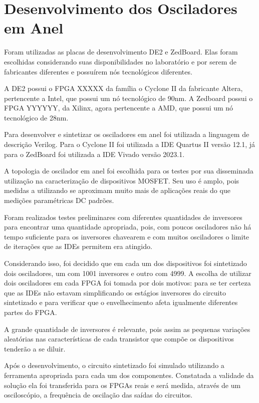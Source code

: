 \section{Desenvolvimento dos Osciladores em Anel}

Foram utilizadas as placas de desenvolvimento DE2 e ZedBoard. Elas foram escolhidas considerando suas disponibilidades no laboratório e por serem de fabricantes diferentes e possuírem nós tecnológicos diferentes.

A DE2 possui o FPGA XXXXX da família o Cyclone II da fabricante Altera, pertencente a Intel, que possui um nó tecnológico de 90nm. A Zedboard possui o FPGA YYYYYY, da Xilinx, agora pertencente a AMD, que possui um nó tecnológico de 28nm.

Para desenvolver e sintetizar os osciladores em anel foi utilizada a linguagem de descrição Verilog. Para o Cyclone II foi utilizada a IDE Quartus II versão 12.1, já para o ZedBoard foi utilizada a IDE Vivado versão 2023.1.

A topologia de oscilador em anel foi escolhida para os testes por sua disseminada utilização na caracterização de dispositivos MOSFET. Seu uso é amplo, pois medidas a utilizando se aproximam muito mais de aplicações reais do que medições paramétricas DC padrões.

Foram realizados testes preliminares com diferentes quantidades de inversores para encontrar uma quantidade apropriada, pois, com poucos osciladores não há tempo suficiente para os inversores chavearem e com muitos osciladores o limite de iterações que as IDEs permitem era atingido.

Considerando isso, foi decidido que em cada um dos dispositivos foi sintetizado dois osciladores, um com 1001 inversores e outro com 4999. A escolha de utilizar dois osciladores em cada FPGA foi tomada por dois motivos: para se ter certeza que as IDEs não estavam simplificando os estágios inversores do circuito sintetizado e para verificar que o envelhecimento afeta igualmente diferentes partes do FPGA.

A grande quantidade de inversores é relevante, pois assim as pequenas variações aleatórias nas características de cada transistor que compõe os dispositivos tenderão a se diluir.

Após o desenvolvimento, o circuito sintetizado foi simulado utilizando a ferramenta apropriada para cada um dos componentes. Constatada a validade da solução ela foi transferida para os FPGAs reais e será medida, através de um osciloscópio, a frequência de oscilação das saídas do circuitos.